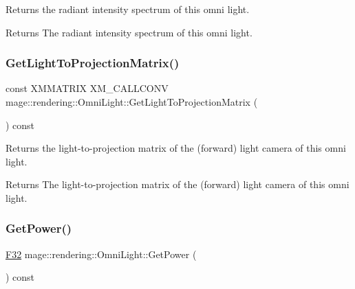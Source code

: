 Returns the radiant intensity spectrum of this omni light.

\begin{DoxyReturn}{Returns}
The radiant intensity spectrum of this omni light. 
\end{DoxyReturn}
\hypertarget{classmage_1_1rendering_1_1_omni_light_aa93d9722b3480fc9997761af89a6d90d}{}\label{classmage_1_1rendering_1_1_omni_light_aa93d9722b3480fc9997761af89a6d90d} 
\subsubsection{\texorpdfstring{Get\+Light\+To\+Projection\+Matrix()}{GetLightToProjectionMatrix()}}
{\footnotesize\ttfamily const X\+M\+M\+A\+T\+R\+IX X\+M\+\_\+\+C\+A\+L\+L\+C\+O\+NV mage\+::rendering\+::\+Omni\+Light\+::\+Get\+Light\+To\+Projection\+Matrix (\begin{DoxyParamCaption}{ }\end{DoxyParamCaption}) const\hspace{0.3cm}{\ttfamily [noexcept]}}

Returns the light-\/to-\/projection matrix of the (forward) light camera of this omni light.

\begin{DoxyReturn}{Returns}
The light-\/to-\/projection matrix of the (forward) light camera of this omni light. 
\end{DoxyReturn}
\hypertarget{classmage_1_1rendering_1_1_omni_light_a43c6be5649668705ffb1ace363960b00}{}\label{classmage_1_1rendering_1_1_omni_light_a43c6be5649668705ffb1ace363960b00} 
\subsubsection{\texorpdfstring{Get\+Power()}{GetPower()}}
{\footnotesize\ttfamily \hyperlink{namespacemage_aa97e833b45f06d60a0a9c4fc22ae02c0}{F32} mage\+::rendering\+::\+Omni\+Light\+::\+Get\+Power (\begin{DoxyParamCaption}{ }\end{DoxyParamCaption}) const\hspace{0.3cm}{\ttfamily [noexcept]}}

